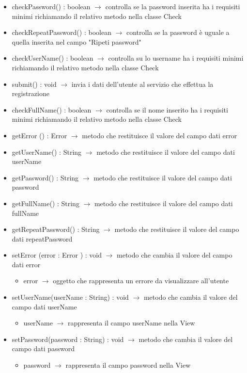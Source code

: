 \begin{description}
\begin{itemize}
	\item checkPassword() : boolean $\rightarrow$ controlla se la password inserita ha i requisiti minimi richiamando il relativo metodo nella classe Check
	\item checkRepeatPassword() : boolean $\rightarrow$ controlla se la password è uguale a quella inserita nel campo "Ripeti password"
	\item checkUserName() : boolean $\rightarrow$ controlla su lo username ha i requisiti minimi richiamando il relativo metodo nella classe Check
	\item submit() : void $\rightarrow$ invia i dati dell'utente al servizio che effettua la registrazione
	\item checkFullName() : boolean $\rightarrow$ controlla se il nome inserito ha i requisiti minimi richiamando il relativo metodo nella classe Check
	\item getError	() : Error	 $\rightarrow$ metodo che restituisce il valore del campo dati error	
	\item getUserName() : String $\rightarrow$ metodo che restituisce il valore del campo dati userName
	\item getPassword() : String $\rightarrow$ metodo che restituisce il valore del campo dati password
	\item getFullName() : String $\rightarrow$ metodo che restituisce il valore del campo dati fullName
	\item getRepeatPassword() : String $\rightarrow$ metodo che restituisce il valore del campo dati repeatPassword
	\item setError	(error	 : Error	) : void $\rightarrow$ metodo che cambia il valore del campo dati error	\begin{itemize}
		\item error	 $\rightarrow$ oggetto che rappresenta un errore da visualizzare all'utente
	\end{itemize}
	
	\item setUserName(userName : String) : void $\rightarrow$ metodo che cambia il valore del campo dati userName\begin{itemize}
		\item userName $\rightarrow$ rappresenta il campo userName nella View
	\end{itemize}
	
	\item setPassword(password : String) : void $\rightarrow$ metodo che cambia il valore del campo dati password\begin{itemize}
		\item password $\rightarrow$ rappresenta il campo password nella View
	\end{itemize}
	

\end{itemize}
\end{description}
